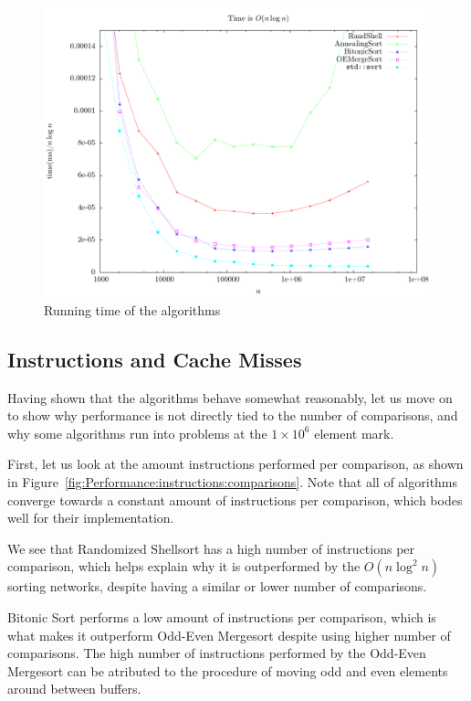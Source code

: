 \begin{figure}
\center
\includegraphics[width=\textwidth]{graphs/Performance/nlogntime.pdf}
\caption{Running time of the algorithms}
\label{fig:Performance:time}
\end{figure}


\subsection{Instructions and Cache Misses}
\label{sec:PerformanceInstructions}

Having shown that the algorithms behave somewhat reasonably, let us move on to show why performance is not directly tied to the number of comparisons, and why some algorithms run into problems at the $1 \times 10^6$ element mark.

First, let us look at the amount instructions performed per comparison, as shown in Figure~\ref{fig:Performance:instructions:comparisons}.
Note that all of algorithms converge towards a constant amount of instructions per comparison, which bodes well for their implementation.

We see that Randomized Shellsort has a high number of instructions per comparison, which helps explain why it is outperformed by the $O (n \log^2 n)$ sorting networks, despite having a similar or lower number of comparisons.

Bitonic Sort performs a low amount of instructions per comparison, which is what makes it outperform Odd-Even Mergesort despite using higher number of comparisons. The high number of instructions performed by the Odd-Even Mergesort can be atributed to the procedure of moving odd and even elements around between buffers.

